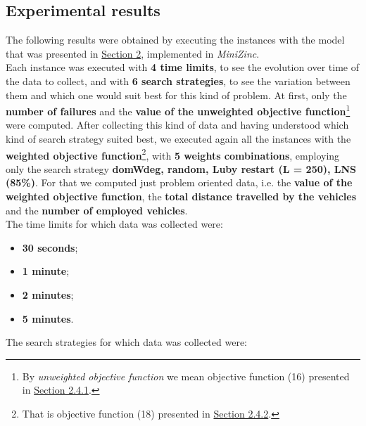 \documentclass[../main.tex]{subfiles}
\begin{document}
\subsection{Experimental results}
\label{subsec:experimental-results}
The following results were obtained by executing the instances with the model that was presented in \hyperref[sec:model]{Section 2}, implemented in \textit{MiniZinc}.\\
Each instance was executed with \textbf{4 time limits}, to see the evolution over time of the data to collect, and with \textbf{6 search strategies}, to see the variation between them and which one would suit best for this kind of problem.
At first, only the \textbf{number of failures} and the \textbf{value of the unweighted objective function}\footnote{By \textit{unweighted objective function} we mean objective function (16) presented in \hyperref[subsubsec:minimizing-total-distance]{Section 2.4.1}.} were computed.
After collecting this kind of data and having understood which kind of search strategy suited best, we executed again all the instances with the \textbf{weighted objective function}\footnote{That is objective function (18) presented in \hyperref[subsubsec:minimizing-total-distance-number-vehicles]{Section 2.4.2}.}, with \textbf{5 weights combinations}, employing only the search strategy \textbf{domWdeg, random, Luby restart (L = 250), LNS (85\%)}.
For that we computed just problem oriented data, i.e. the \textbf{value of the weighted objective function}, the \textbf{total distance travelled by the vehicles} and the \textbf{number of employed vehicles}.\\
The time limits for which data was collected were:
\begin{itemize}
    \item \textbf{30 seconds};
    \item \textbf{1 minute};
    \item \textbf{2 minutes};
    \item \textbf{5 minutes}.
\end{itemize}
The search strategies for which data was collected were:
\end{document}
